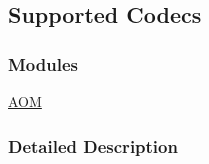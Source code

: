 \hypertarget{group__codecs}{}\subsection{Supported Codecs}
\label{group__codecs}
\subsubsection*{Modules}
\begin{DoxyCompactItemize}
\item 
\hyperlink{group__aom}{A\+OM}
\end{DoxyCompactItemize}


\subsubsection{Detailed Description}
